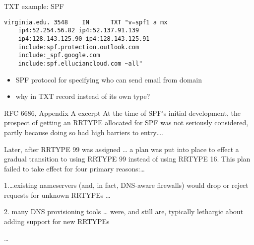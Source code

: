 \begin{frame}[fragile]{TXT example: SPF}
\begin{Verbatim}[fontsize=\small]
virginia.edu. 3548    IN      TXT "v=spf1 a mx
    ip4:52.254.56.82 ip4:52.137.91.139
    ip4:128.143.125.90 ip4:128.143.125.91
    include:spf.protection.outlook.com
    include:_spf.google.com
    include:spf.elluciancloud.com ~all"
\end{Verbatim}
\begin{itemize}
\item SPF protocol for specifying who can send email from domain
\item why in TXT record instead of its own type?
\end{itemize}
\end{frame}

\begin{frame}{RFC 6686, Appendix A excerpt} 
\fontsize{13}{14}\selectfont
At the time of SPF's initial development, the prospect of getting an
RRTYPE allocated for SPF was not seriously considered, partly because
doing so had high barriers to entry\ldots.

\vspace{.5cm}

Later, after RRTYPE 99 was assigned \ldots
a plan was put into place to effect a gradual
transition to using RRTYPE 99 instead of using RRTYPE 16.
This plan failed to take effect for four primary reasons:\ldots

\vspace{.5cm}

1.\ldots existing nameservers (and, in fact, DNS-aware firewalls) would drop or
reject requests for unknown RRTYPEs \ldots

\vspace{.5cm}

2. many DNS provisioning tools \ldots
   were, and still are, typically lethargic about
   adding support for new RRTYPEs

\vspace{.5cm}

\ldots
\end{frame}
